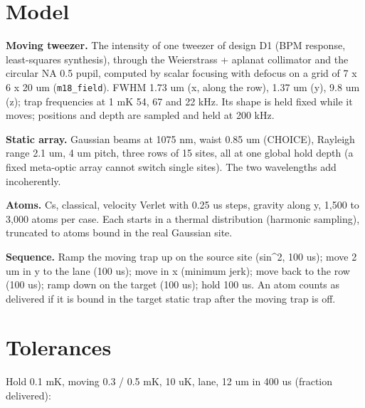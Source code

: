 \hypertarget{2-model}{%
\section{Model}\label{transport3d-2-model}}

\textbf{Moving tweezer.} The intensity of one tweezer of design D1 (BPM
response, least-squares synthesis), through the Weierstrass + aplanat
collimator and the circular NA 0.5 pupil, computed by scalar focusing
with defocus on a grid of 7 x 6 x 20 um (\texttt{m18\_field}). FWHM 1.73
um (x, along the row), 1.37 um (y), 9.8 um (z); trap frequencies at 1 mK
54, 67 and 22 kHz. Its shape is held fixed while it moves; positions and
depth are sampled and held at 200 kHz.

\textbf{Static array.} Gaussian beams at 1075 nm, waist 0.85 um
(CHOICE), Rayleigh range 2.1 um, 4 um pitch, three rows of 15 sites, all
at one global hold depth (a fixed meta-optic array cannot switch single
sites). The two wavelengths add incoherently.

\textbf{Atoms.} Cs, classical, velocity Verlet with 0.25 us steps,
gravity along y, 1,500 to 3,000 atoms per case. Each starts in a thermal
distribution (harmonic sampling), truncated to atoms bound in the real
Gaussian site.

\textbf{Sequence.} Ramp the moving trap up on the source site (sin\^{}2,
100 us); move 2 um in y to the lane (100 us); move in x (minimum jerk);
move back to the row (100 us); ramp down on the target (100 us); hold
100 us. An atom counts as delivered if it is bound in the target static
trap after the moving trap is off.

\hypertarget{3-tolerances}{%
\section{Tolerances}\label{transport3d-3-tolerances}}

Hold 0.1 mK, moving 0.3 / 0.5 mK, 10 uK, lane, 12 um in 400 us (fraction
delivered):

